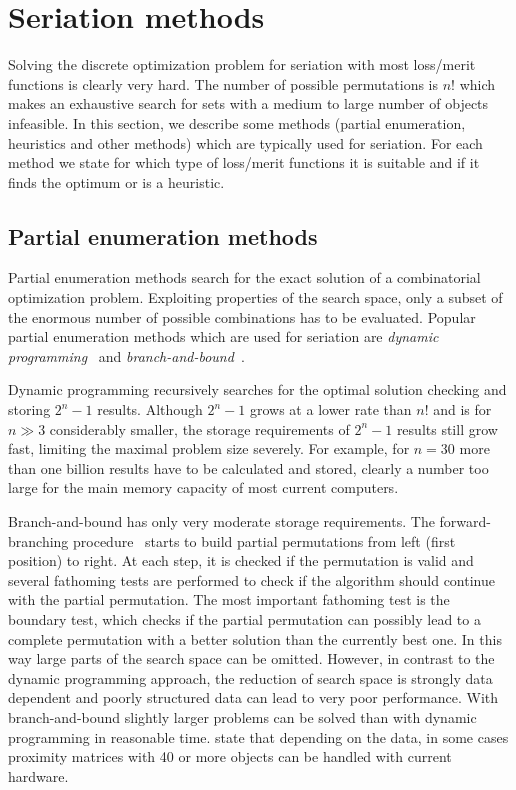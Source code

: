 \documentclass[fleqn, a4paper]{article}
\begin{document}
\section{Seriation methods}
\label{sec:methods}

Solving the discrete optimization problem for seriation with most loss/merit
functions is clearly very hard. The number of possible permutations is $n!$
which makes an exhaustive search for sets with a medium to large number of
objects infeasible.  In this section, we describe some methods (partial
enumeration, heuristics and other methods) which are typically used for
seriation. For each method we state for which type of loss/merit functions it
is suitable and if it finds the optimum or is a heuristic.

\subsection{Partial enumeration methods}

Partial enumeration methods search for the exact solution of a
combinatorial optimization problem.  Exploiting properties of the search
space, only a subset of the enormous number of possible combinations has
to be evaluated.  Popular partial enumeration methods which are used for
seriation are \emph{dynamic programming}~\citep{seriation:Hubert:1987}
and \emph{branch-and-bound}~\citep{seriation:Brusco:2005}.

Dynamic programming recursively searches for the optimal solution checking and
storing $2^n-1$ results. Although $2^n-1$ grows at a lower rate than $n!$ and
is for $n \gg 3$ considerably smaller, the storage requirements of $2^n-1$
results still grow fast, limiting the maximal problem size severely. For
example, for $n=30$ more than one billion results have to be calculated and
stored, clearly a number too large for the main memory capacity of most current
computers.

Branch-and-bound has only very moderate storage requirements. The
forward-branching procedure~\citep{seriation:Brusco:2005} starts to build
partial permutations from left (first position) to right. At each step, it is
checked if the permutation is valid and several fathoming tests are performed
to check if the algorithm should continue with the partial permutation.  The
most important fathoming test is the boundary test, which checks if the partial
permutation can possibly lead to a complete permutation with a better solution
than the currently best one.  In this way large parts of the search space can
be omitted. However, in contrast to the dynamic programming approach, the
reduction of search space is strongly data dependent and poorly structured
data can lead to very poor performance.  With branch-and-bound slightly larger
problems can be solved than with dynamic programming in reasonable time.
\cite{seriation:Brusco:2005} state that depending on the data, in some cases
proximity matrices with 40 or more objects can be handled with current 
hardware.
\end{document}
